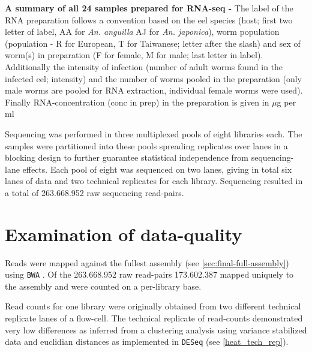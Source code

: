 \begin{table}[h]
\begin{center}
\caption[Summary of RNA preparation]{\textbf{A summary of all 24
    samples prepared for RNA-seq -} The label of the RNA preparation
  follows a convention based on the eel species (host; first two
  letter of label, AA for \textit{An. anguilla} AJ for
  \textit{An. japonica}), worm population (population - R for
  European, T for Taiwanese; letter after the slash) and sex of
  worm(s) in preparation (F for female, M for male; last letter in
  label). Additionally the intensity of infection (number of adult
  worms found in the infected eel; intensity) and the number of worms
  pooled in the preparation (only male worms are pooled for RNA
  extraction, individual female worms were used). Finally
  RNA-concentration (conc in prep) in the preparation is given in
  $\mu$g per ml}
\label{tab:lib-prep}
\end{center}
\end{table}

Sequencing was performed in three multiplexed pools of eight libraries
each. The samples were partitioned into these pools spreading
replicates over lanes in a blocking design to further guarantee
statistical independence from sequencing-lane effects. Each pool of
eight was sequenced on two lanes, giving in total six lanes of data
and two technical replicates for each library. Sequencing resulted in
a total of 263.668.952 raw sequencing read-pairs.

\section{Examination of data-quality}

Reads were mapped against the fullest assembly (see
\ref{sec:final-full-assembly}) using \texttt{BWA}
\cite{pmid20080505}. Of the 263.668.952 raw read-pairs 173.602.387
mapped uniquely to the assembly and were counted on a per-library
base.

Read counts for one library were originally obtained from two
different technical replicate lanes of a flow-cell. The technical
replicate of read-counts demonstrated very low differences as inferred
from a clustering analysis using variance stabilized data and
euclidian distances as implemented in \texttt{DESeq}
\cite{pmid20979621} (see \ref{heat_tech_rep}).



